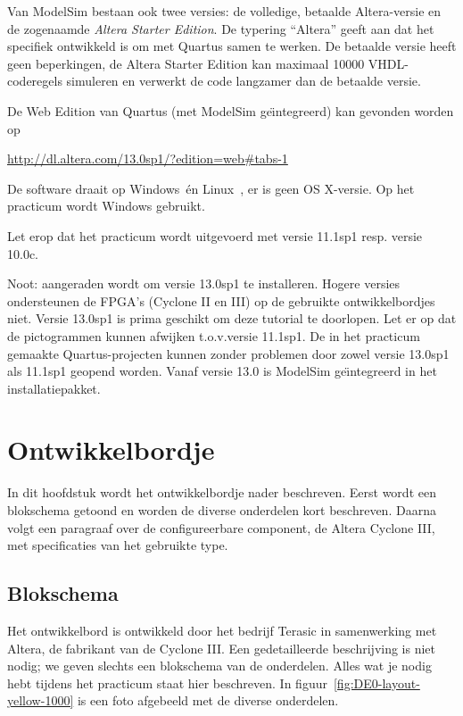 \documentclass[a4paper,12pt,fleqn,twoside]{book}
\begin{document}
Van ModelSim bestaan ook twee versies: de volledige, betaalde Altera-versie en
de zogenaamde \textsl{Altera Starter Edition}. De typering ``Altera'' geeft aan
dat het specifiek ontwikkeld is om met Quartus samen te werken. De betaalde
versie heeft geen beperkingen, de Altera Starter Edition kan maximaal 10000
VHDL-coderegels simuleren en verwerkt de code langzamer dan de betaalde versie.

De Web Edition van Quartus (met ModelSim ge\"{\i}ntegreerd) kan gevonden
worden op

\hspace*{1cm}\url{http://dl.altera.com/13.0sp1/?edition=web#tabs-1}

%

De software draait op Windows\texttrademark\ \'{e}n Linux\texttrademark\ , er
is geen OS X-versie. Op het practicum wordt Windows gebruikt.

Let erop dat het practicum wordt uitgevoerd met versie 11.1sp1 resp\@. versie
10.0c.

Noot: aangeraden wordt om versie 13.0sp1 te installeren. Hogere versies
ondersteunen de FPGA's (Cyclone II en III) op de gebruikte ontwikkelbordjes
niet. Versie 13.0sp1 is prima geschikt om deze tutorial te doorlopen. Let er
op dat de pictogrammen kunnen afwijken t.o.v.\@ versie 11.1sp1. De in
het practicum gemaakte Quartus-projecten
kunnen zonder problemen door zowel versie 13.0sp1 als 11.1sp1 geopend worden.
Vanaf versie 13.0 is ModelSim ge\"{\i}ntegreerd in het installatiepakket.




\chapter{Ontwikkelbordje}
\label{chap:ontwikkelbordje}
In dit hoofdstuk wordt het ontwikkelbordje nader beschreven. Eerst wordt een
blokschema getoond en worden de diverse onderdelen kort beschreven. Daarna
volgt een paragraaf over de configureerbare component, de Altera Cyclone III,
met specificaties van het gebruikte type.


\section{Blokschema}
\label{sec:blokschema}
Het ontwikkelbord is ontwikkeld door het bedrijf Terasic in samenwerking met
Altera, de fabrikant van de Cyclone III. Een gedetailleerde beschrijving is
niet nodig; we geven slechts een blokschema van de onderdelen. Alles wat je
nodig hebt tijdens het practicum staat hier beschreven. In
figuur~\ref{fig:DE0-layout-yellow-1000} is een foto afgebeeld met de diverse
onderdelen.
\end{document}
